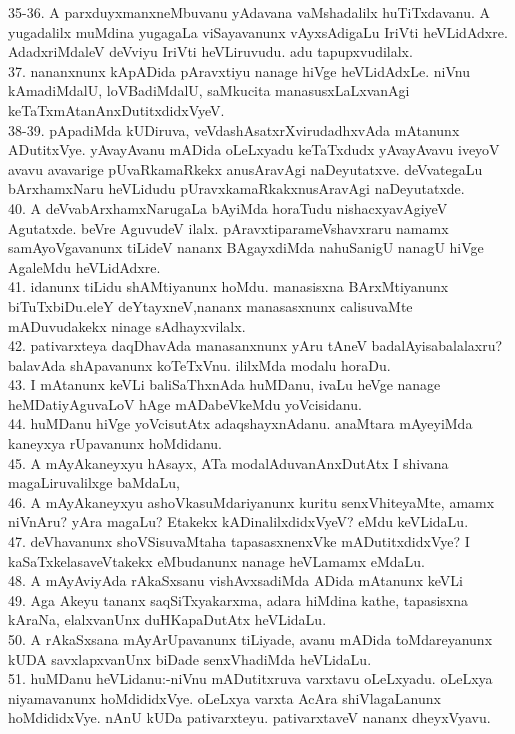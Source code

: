 \documentclass{article}
\begin{document}
35-36. A parxduyxmanxneMbuvanu yAdavana vaMshadalilx huTiTxdavanu. A yugadalilx muMdina yugagaLa viSayavanunx vAyxsAdigaLu IriVti heVLidAdxre. AdadxriMdaleV deVviyu IriVti heVLiruvudu. adu tapupxvudilalx.\\
37. nananxnunx kApADida pAravxtiyu nanage hiVge heVLidAdxLe. niVnu kAmadiMdalU, loVBadiMdalU, saMkucita manasusxLaLxvanAgi keTaTxmAtanAnxDutitxdidxVyeV.\\
38-39. pApadiMda kUDiruva, veVdashAsatxrXvirudadhxvAda mAtanunx ADutitxVye. yAvayAvanu mADida oLeLxyadu keTaTxdudx yAvayAvavu iveyoV avavu avavarige pUvaRkamaRkekx anusAravAgi naDeyutatxve. deVvategaLu bArxhamxNaru heVLidudu pUravxkamaRkakxnusAravAgi naDeyutatxde.\\
40. A deVvabArxhamxNarugaLa bAyiMda horaTudu nishacxyavAgiyeV Agutatxde. beVre AguvudeV ilalx. pAravxtiparameVshavxraru namamx samAyoVgavanunx tiLideV nananx BAgayxdiMda nahuSanigU nanagU hiVge AgaleMdu heVLidAdxre.\\
41. idanunx tiLidu shAMtiyanunx hoMdu. manasisxna BArxMtiyanunx biTuTxbiDu.eleY deYtayxneV,nananx manasasxnunx calisuvaMte mADuvudakekx ninage sAdhayxvilalx.\\
42. pativarxteya daqDhavAda manasanxnunx yAru tAneV badalAyisabalalaxru? balavAda shApavanunx koTeTxVnu. ililxMda modalu horaDu.\\
43. I mAtanunx keVLi baliSaThxnAda huMDanu, ivaLu heVge nanage heMDatiyAguvaLoV hAge mADabeVkeMdu yoVcisidanu.\\
44. huMDanu hiVge yoVcisutAtx adaqshayxnAdanu. anaMtara mAyeyiMda kaneyxya rUpavanunx hoMdidanu.\\
45. A mAyAkaneyxyu hAsayx, ATa modalAduvanAnxDutAtx I shivana magaLiruvalilxge baMdaLu,\\
46. A mAyAkaneyxyu ashoVkasuMdariyanunx kuritu senxVhiteyaMte, amamx niVnAru? yAra magaLu? Etakekx kADinalilxdidxVyeV? eMdu keVLidaLu.\\
47. deVhavanunx shoVSisuvaMtaha tapasasxnenxVke mADutitxdidxVye? I kaSaTxkelasaveVtakekx eMbudanunx nanage heVLamamx eMdaLu.\\
48. A mAyAviyAda rAkaSxsanu vishAvxsadiMda ADida mAtanunx keVLi\\
49. Aga Akeyu tananx saqSiTxyakarxma, adara hiMdina kathe, tapasisxna kAraNa, elalxvanUnx duHKapaDutAtx heVLidaLu.\\
50. A rAkaSxsana mAyArUpavanunx tiLiyade, avanu mADida toMdareyanunx kUDA savxlapxvanUnx biDade senxVhadiMda heVLidaLu.\\
51. huMDanu heVLidanu:-niVnu mADutitxruva varxtavu oLeLxyadu. oLeLxya niyamavanunx hoMdididxVye. oLeLxya varxta AcAra shiVlagaLanunx hoMdididxVye. nAnU kUDa pativarxteyu. pativarxtaveV nananx dheyxVyavu.\\
\end{document}

